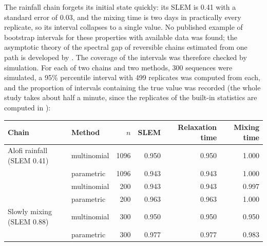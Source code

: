 \documentclass[
  nojss]{jss}
\begin{document}
The rainfall chain forgets its initial state quickly: its SLEM is 0.41 with
a standard error of 0.03, and the mixing time is two days in practically
every replicate, so its interval collapses to a single value. No published
example of bootstrap intervals for these properties with available data was
found; the asymptotic theory of the spectral gap of reversible chains
estimated from one path is developed by \cite{hsu2019mixing}. The coverage
of the intervals was therefore checked by simulation. For each of two chains
and two methods, 300 sequences were simulated, a 95\% percentile interval
with 499 replicates was computed from each, and the proportion of intervals
containing the true value was recorded (the whole study takes about half a
minute, since the replicates of the built-in statistics are computed in
):

\begin{CodeChunk}
\end{CodeChunk}

\begin{center}
\begin{tabular}{llrrrr}
\hline
Chain & Method & $n$ & SLEM & Relaxation time & Mixing time \\
\hline
Alofi rainfall (SLEM 0.41) & multinomial & 1096 & 0.950 & 0.950 & 1.000 \\
 & parametric & 1096 & 0.943 & 0.943 & 1.000 \\
 & multinomial & 200 & 0.943 & 0.943 & 0.997 \\
 & parametric & 200 & 0.963 & 0.963 & 1.000 \\
Slowly mixing (SLEM 0.88) & multinomial & 300 & 0.950 & 0.950 & 0.950 \\
 & parametric & 300 & 0.977 & 0.977 & 0.983 \\
\hline
\end{tabular}
\end{center}
\end{document}
